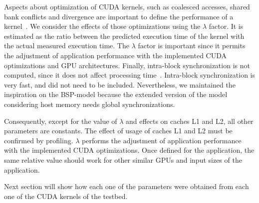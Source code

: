 Aspects about optimization of CUDA kernels, such as coalesced accesses, shared bank conflicts and divergence are important to define the performance of a kernel~\citep{Wu:2013:Coalesced}. We consider the effects of those optimizations using the $\lambda$ factor.  It is estimated as the ratio between the predicted execution time of the kernel with the actual measured execution time. The $\lambda$ factor is important since it permits the adjustment of application performance with the implemented CUDA optimizations and GPU architectures. Finally, intra-block synchronization is not computed, since it does not affect processing time~\citep{CUDA:Best,GpuNOsynchronize}. Intra-block synchronization is very fast, and did not need to be included. Nevertheless, we maintained the inspiration on the BSP-model because the extended version of the model considering host memory needs global synchronizations.

Consequently, except for the value of $\lambda$ and effects on caches L1 and L2, all other parameters are constants. The effect of usage of caches L1 and L2 must be confirmed by profiling. $\lambda$ performs the adjustment of application performance with the implemented CUDA optimizations. Once defined for the application, the same relative value should work for other similar GPUs and input sizes of the application. 

Next section will show how each one of the parameters were obtained from each one of the CUDA kernels of the testbed.
